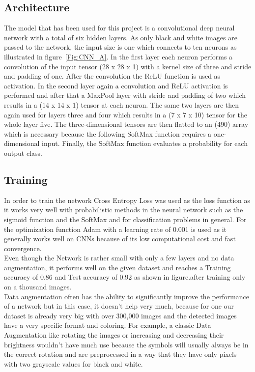 \documentclass[@CLASSOPTIONS@]{tumarticle}
\begin{document}
\subsection{Architecture}

The model that has been used for this project is a convolutional deep neural network with a total of six hidden layers.
As only black and white images are passed to the network, the input size is one which connects to ten neurons as
illustrated in figure~\ref{Fig:CNN_A}. In the first layer each neuron performs a convolution of the input tensor (28 x 28 x 1) with
a kernel size of three and stride and padding of one.
After the convolution the ReLU function is used as activation.
In the second layer again a convolution and ReLU activation is performed and after that a MaxPool layer with stride and
padding of two which results in a (14 x 14 x 1) tensor at each neuron. The same two layers are then again used for layers three and four which results in a (7 x 7 x 10) tensor for the whole
layer five. The three-dimensional tensors are then flatted to an (490) array which is necessary because the following SoftMax
function requires a one-dimensional input. Finally, the SoftMax function evaluates a probability for each output class.

\subsection{Training}

In order to train the network Cross Entropy Loss was used as the loss function as it works very well with probabilistic
methods in the neural network such as the sigmoid function and the SoftMax and for classification problems in general.
For the optimization function Adam with a learning rate of 0.001 is used as it generally works well on CNNs because of
its low computational cost and fast convergence.\\
Even though the Network is rather small with only a few layers and no
data augmentation, it performs well on the given dataset and reaches a Training accuracy of 0.86 and Test accuracy of
0.92 as shown in figure.after training only on a thousand images.\\
Data augmentation often has the ability to
significantly improve the performance of a network but in this case, it doesn’t help very much, because for one our
dataset is already very big with over 300,000 images and the detected images have a very specific format and coloring.
For example, a classic Data Augmentation like rotating the images or increasing and decreasing their brightness wouldn’t
have much use because the symbols will usually always be in the correct rotation and are preprocessed in a way that they
have only pixels with two grayscale values for black and white.
\end{document}
